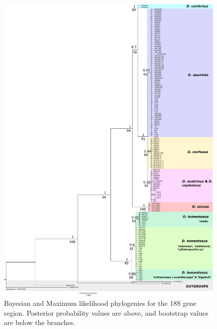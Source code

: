 \clearpage
\begin{figure}[H]
	\centering
	\includegraphics[scale =0.5]{Images/18S.pdf}
	\caption{Bayesian and Maximum likelihood  phylogenies for the 18S gene region. Posterior probability values are above, and bootstrap values are below the branches.} 
	\label{fig:18S_tree}
\end{figure}

